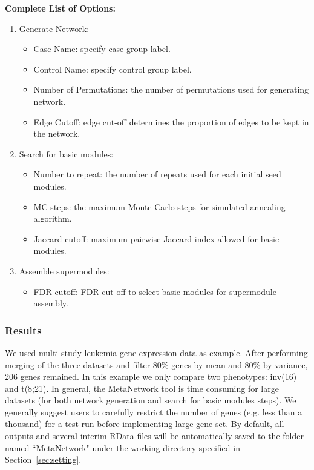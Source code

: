 \textbf{Complete List of Options:} 
\begin{enumerate}
\item Generate Network:
\begin{itemize}
\item Case Name: specify case group label.
\item Control Name: specify control group label.
\item Number of Permutations: the number of permutations used for generating network.
\item Edge Cutoff: edge cut-off  determines the proportion of edges to be kept in the network.
\end{itemize}

\item Search for basic modules:
\begin{itemize}
\item Number to repeat:  the number of repeats used for each initial seed modules.
\item MC steps:  the maximum Monte Carlo steps for simulated annealing algorithm.
\item Jaccard cutoff: maximum pairwise Jaccard index allowed for basic modules.
\end{itemize}
\item Assemble supermodules:

\begin{itemize}
\item FDR cutoff:  FDR cut-off to select basic modules for supermodule assembly.
\end{itemize}

\end{enumerate}

\subsubsection{Results}

We used multi-study leukemia gene expression data as example.
After performing merging of the three datasets and filter 80\% genes by mean and 80\% by variance, 206 genes remained.
In this example we only compare two phenotypes: inv(16) and t(8;21).
In general, the MetaNetwork tool is time consuming for large datasets (for both network generation and search for basic modules steps).
We generally suggest users to carefully restrict the number of genes (e.g. less than a thousand) for a test run before implementing large gene set.
By default, all outputs and several interim RData files will be automatically saved to the folder named ``MetaNetwork" under the working directory specified in Section~\ref{sec:setting}.


